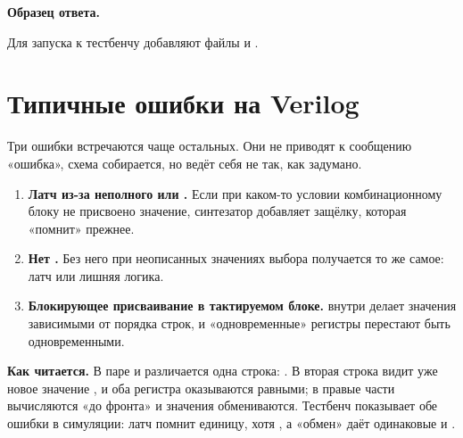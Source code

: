 \textbf{Образец ответа.}\par\nopagebreak
{}
Для запуска к тестбенчу добавляют файлы  и .


\section{Типичные ошибки на Verilog}
\label{sec:v-pitfalls}

Три ошибки встречаются чаще остальных. Они не приводят к сообщению
«ошибка», схема собирается, но ведёт себя не так, как задумано.

\begin{enumerate}
  \item \textbf{Латч из-за неполного  или .} Если при
        каком-то условии комбинационному блоку не присвоено значение, синтезатор
        добавляет защёлку, которая «помнит» прежнее.
  \item \textbf{Нет .} Без него при неописанных значениях выбора
        получается то же самое: латч или лишняя логика.
  \item \textbf{Блокирующее присваивание в тактируемом блоке.} \code{=} внутри
         делает значения зависимыми от порядка строк,
        и «одновременные» регистры перестают быть одновременными.
\end{enumerate}


\textbf{Как читается.} В паре  и  различается
одна строка: . В  вторая строка видит уже
новое значение , и оба регистра оказываются равными; в 
правые части вычисляются «до фронта» и значения обмениваются. Тестбенч
 показывает обе ошибки в симуляции: латч помнит
единицу, хотя , а «обмен» даёт одинаковые  и .

